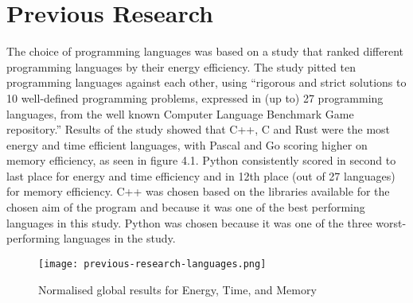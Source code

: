 \chapter{Previous Research}
The choice of programming languages was based on a study that ranked different programming languages by their energy efficiency. The study pitted ten programming languages against each other, using “rigorous and strict solutions to 10 well-defined programming problems, expressed in (up to) 27 programming languages, from the well known Computer Language Benchmark Game repository.” \cite{PEREIRA2021102609} Results of the study showed that C++, C and Rust were the most energy and time efficient languages, with Pascal and Go scoring higher on memory efficiency, as seen in figure 4.1. Python consistently scored in second to last place for energy and time efficiency and in 12th place (out of 27 languages) for memory efficiency.
C++ was chosen based on the libraries available for the chosen aim of the program and because it was one of the best performing languages in this study.
Python was chosen because it was one of the three worst-performing languages in the study.

\begin{figure}[htbp]
	\centering
	\texttt{[image: previous-research-languages.png]}
	\caption{Normalised global results for Energy, Time, and Memory \cite[p.16]{PEREIRA2021102609}}
	\label{figure:previous-research-languages}
\end{figure}

